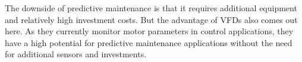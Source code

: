 The downside of predictive maintenance is that it requires additional equipment and relatively high investment costs. But the advantage of VFDs also comes out here. As they currently monitor motor parameters in control applications, they have a high potential for predictive maintenance applications without the need for additional sensors and investments.





